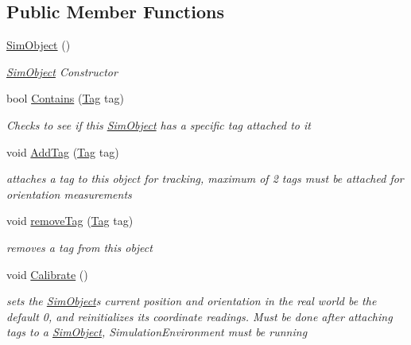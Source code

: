 \subsection*{Public Member Functions}
\begin{DoxyCompactItemize}
\item 
\hyperlink{class_pozyx_positioner_1_1_framework_1_1_sim_object_acc186255ccf8c50a2de3aeaf8e65f645}{Sim\+Object} ()
\begin{DoxyCompactList}\small\item\em \hyperlink{class_pozyx_positioner_1_1_framework_1_1_sim_object}{Sim\+Object} Constructor \end{DoxyCompactList}\item 
bool \hyperlink{class_pozyx_positioner_1_1_framework_1_1_sim_object_a68a000516251ee3062ec72c22cc75f6d}{Contains} (\hyperlink{class_pozyx_positioner_1_1_framework_1_1_tag}{Tag} tag)
\begin{DoxyCompactList}\small\item\em Checks to see if this \hyperlink{class_pozyx_positioner_1_1_framework_1_1_sim_object}{Sim\+Object} has a specific tag attached to it \end{DoxyCompactList}\item 
void \hyperlink{class_pozyx_positioner_1_1_framework_1_1_sim_object_a46185130a7147410af586622732ad64a}{Add\+Tag} (\hyperlink{class_pozyx_positioner_1_1_framework_1_1_tag}{Tag} tag)
\begin{DoxyCompactList}\small\item\em attaches a tag to this object for tracking, maximum of 2 tags must be attached for orientation measurements \end{DoxyCompactList}\item 
void \hyperlink{class_pozyx_positioner_1_1_framework_1_1_sim_object_a7cbe138ef2d7a74045a2e706ae3f59b4}{remove\+Tag} (\hyperlink{class_pozyx_positioner_1_1_framework_1_1_tag}{Tag} tag)
\begin{DoxyCompactList}\small\item\em removes a tag from this object \end{DoxyCompactList}\item 
void \hyperlink{class_pozyx_positioner_1_1_framework_1_1_sim_object_ae5a40c80792b6e84ae90cf31e2b5fc8f}{Calibrate} ()
\begin{DoxyCompactList}\small\item\em sets the \hyperlink{class_pozyx_positioner_1_1_framework_1_1_sim_object}{Sim\+Object}\textquotesingle{}s current position and orientation in the real world be the default 0, and reinitializes its coordinate readings. Must be done after attaching tags to a \hyperlink{class_pozyx_positioner_1_1_framework_1_1_sim_object}{Sim\+Object}, Simulation\+Environment must be running \end{DoxyCompactList}\item 

\end{DoxyCompactItemize}
